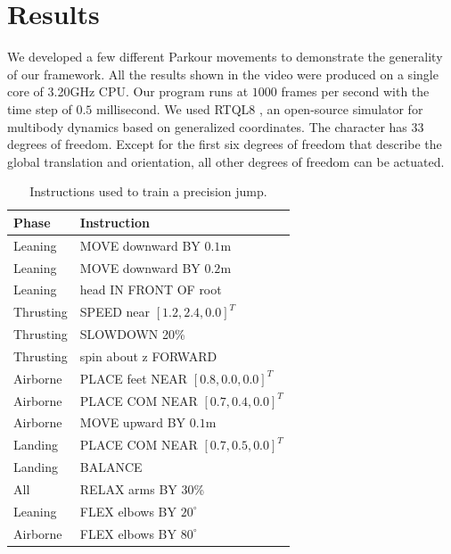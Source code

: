 \section{Results}
We developed a few different Parkour movements to demonstrate the
generality of our framework. All the results shown in the video were
produced on a single core of 3.20GHz CPU. Our program runs at $1000$
frames per second with the time step of $0.5$ millisecond. We used
RTQL8 \cite{RTQL8:2012:URL}, an open-source simulator for multibody
dynamics based on generalized coordinates. The character has $33$
degrees of freedom. Except for the first six degrees of freedom that
describe the global translation and orientation, all other degrees of
freedom can be actuated.  

\begin{table}[ht]
  \center
  \caption{Instructions used to train a precision jump.}
  \begin{tabular}{ | p{3.0cm} | p{7.0cm} | }
    \hline
    Phase & Instruction \\ \hline
    Leaning & MOVE downward BY $0.1$m \\ \hline
    Leaning & MOVE downward BY $0.2$m \\ \hline
    Leaning & head IN FRONT OF root \\ \hline
    Thrusting & SPEED near $[1.2, 2.4, 0.0]^T$ \\ \hline
    Thrusting & SLOWDOWN 20\% \\ \hline
    Thrusting & spin about z FORWARD \\ \hline
    Airborne &  PLACE feet NEAR $[0.8, 0.0, 0.0]^T$ \\ \hline
    Airborne & PLACE COM NEAR $[0.7, 0.4, 0.0]^T$ \\ \hline
    Airborne & MOVE upward BY $0.1$m \\ \hline
    Landing & PLACE COM NEAR $[0.7, 0.5, 0.0]^T$ \\ \hline
    Landing & BALANCE \\ \hline
    All & RELAX arms BY 30\%\\ \hline
    Leaning & FLEX elbows BY $20^\circ$ \\ \hline
    Airborne & FLEX elbows BY $80^\circ$ \\ \hline
  \end{tabular}

  \label{tab:parkour_instructions}
\end{table}

